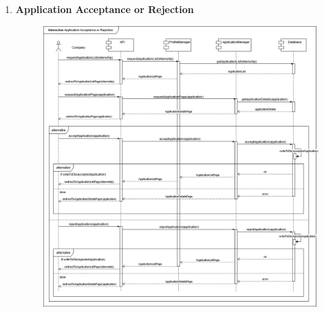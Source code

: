\begin{enumerate}
    \newpage
    \item \textbf{Application Acceptance or Rejection}
    \begin{figure}[h!]
            \centering  \includegraphics[width=1\textwidth]{DD/Images/Interactions/INT14_ApplicationAcceptanceOrRejection.drawio.png}
            \label{fig:ComponentViewDiagram}
    \end{figure}


\end{enumerate}
